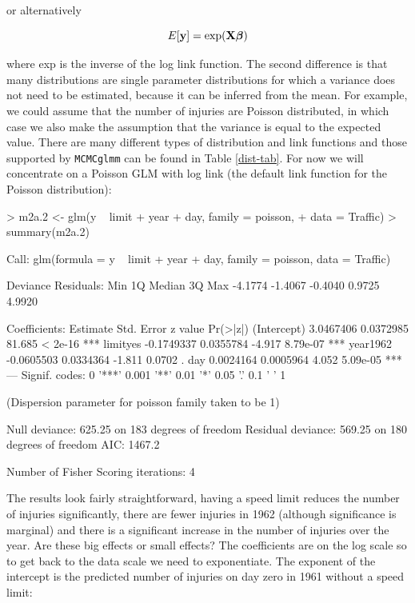 \documentclass{article}
\begin{document}
or alternatively

\begin{equation}
E[{\bf y}] = \textrm{exp}({\bf X}{\bm \beta})
\end{equation}

where \textrm{exp} is the inverse of the log link function. The second difference is that many distributions are single parameter distributions for which a variance does not need to be estimated, because it can be inferred from the mean. For example, we could assume that the number of injuries are Poisson distributed, in which case we also make the assumption that the variance is equal to the expected value.  There are many different types of distribution and link functions and those supported by \texttt{MCMCglmm} can be found in Table \ref{dist-tab}. For now we will concentrate on a Poisson GLM with log link (the default link function for the Poisson distribution):

\begin{Schunk}
\begin{Sinput}
> m2a.2 <- glm(y ~ limit + year + day, family = poisson, 
+     data = Traffic)
> summary(m2a.2)
\end{Sinput}
\begin{Soutput}
Call:
glm(formula = y ~ limit + year + day, family = poisson, data = Traffic)

Deviance Residuals: 
    Min       1Q   Median       3Q      Max  
-4.1774  -1.4067  -0.4040   0.9725   4.9920  

Coefficients:
              Estimate Std. Error z value Pr(>|z|)    
(Intercept)  3.0467406  0.0372985  81.685  < 2e-16 ***
limityes    -0.1749337  0.0355784  -4.917 8.79e-07 ***
year1962    -0.0605503  0.0334364  -1.811   0.0702 .  
day          0.0024164  0.0005964   4.052 5.09e-05 ***
---
Signif. codes:  0 '***' 0.001 '**' 0.01 '*' 0.05 '.' 0.1 ' ' 1 

(Dispersion parameter for poisson family taken to be 1)

    Null deviance: 625.25  on 183  degrees of freedom
Residual deviance: 569.25  on 180  degrees of freedom
AIC: 1467.2

Number of Fisher Scoring iterations: 4
\end{Soutput}
\end{Schunk}

The results look fairly straightforward, having a speed limit reduces the number of injuries significantly, there are fewer injuries in 1962 (although significance is marginal) and there is a significant increase in the number of injuries over the year. Are these big effects or small effects? The coefficients are on the log scale so to get back to the data scale we need to exponentiate. The exponent of the intercept is the predicted number of injuries on day zero in 1961 without a speed limit:
\end{document}
